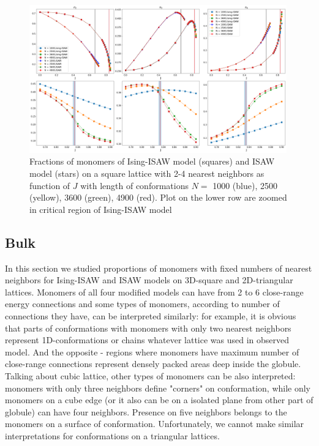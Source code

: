 \documentclass[a4paper]{jpconf}
\begin{document}
\begin{figure}
    \centering
    \includegraphics[width=0.99\textwidth]{Images/bulk2-4.png}
    \caption{Fractions of monomers of Ising-ISAW model (squares) and ISAW model (stars) on a square lattice with 2-4 nearest neighbors as function of $J$ with length of conformations $N = $ 1000 (blue), 2500 (yellow), 3600 (green), 4900 (red). Plot on the lower row are zoomed in critical region of Ising-ISAW model}
    \label{fig:Ising_vs_ISAW2D}
\end{figure}

\subsection{Bulk}

In this section we studied proportions of monomers with fixed numbers of nearest neighbors for Ising-ISAW and ISAW models on 3D-square and 2D-triangular lattices. Monomers of all four modified models can have from 2 to 6 close-range energy connections and some types of monomers, according to number of connections they have, can be interpreted similarly: for example, it is obvious that parts of conformations with monomers with only two nearest neighbors represent 1D-conformations or chains whatever lattice was used in observed model. And the opposite - regions where monomers have maximum number of close-range connections represent densely packed areas deep inside the globule. Talking about cubic lattice, other types of monomers can be also interpreted: monomers with only three neighbors define "corners" on conformation, while only monomers on a cube edge (or it also can be on a isolated plane from other part of globule) can have four neighbors. Presence on five neighbors belongs to the monomers on a surface of conformation. Unfortunately, we cannot make similar interpretations for conformations on a triangular lattices.
\end{document}
